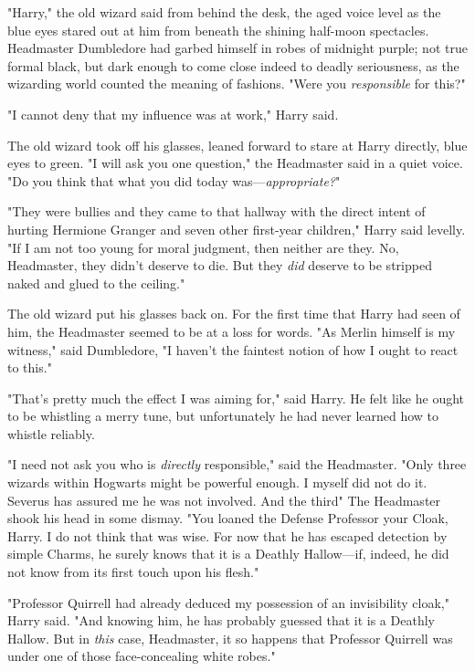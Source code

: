 "Harry," the old wizard said from behind the desk, the aged voice level as the
blue eyes stared out at him from beneath the shining half-moon spectacles.
Headmaster Dumbledore had garbed himself in robes of midnight purple; not true
formal black, but dark enough to come close indeed to deadly seriousness, as
the wizarding world counted the meaning of fashions. "Were you{\el}
\emph{responsible} for this?"

"I cannot deny that my influence was at work," Harry said.

The old wizard took off his glasses, leaned forward to stare at Harry directly,
blue eyes to green. "I will ask you one question," the Headmaster said in a
quiet voice. "Do you think that what you did today was---\emph{appropriate?}"

"They were bullies and they came to that hallway with the direct intent of
hurting Hermione Granger and seven other first-year children," Harry said
levelly. "If I am not too young for moral judgment, then neither are they. No,
Headmaster, they didn't deserve to die. But they \emph{did} deserve to be
stripped naked and glued to the ceiling."

The old wizard put his glasses back on. For the first time that Harry had seen
of him, the Headmaster seemed to be at a loss for words. "As Merlin himself is
my witness," said Dumbledore, "I haven't the faintest notion of how I ought to
react to this."

"That's pretty much the effect I was aiming for," said Harry. He felt like he
ought to be whistling a merry tune, but unfortunately he had never learned how
to whistle reliably.

"I need not ask you who is \emph{directly} responsible," said the Headmaster.
"Only three wizards within Hogwarts might be powerful enough. I myself did not
do it. Severus has assured me he was not involved. And the third{\el}" The
Headmaster shook his head in some dismay. "You loaned the Defense Professor
your Cloak, Harry. I do not think that was wise. For now that he has escaped
detection by simple Charms, he surely knows that it is a Deathly Hallow---if,
indeed, he did not know from its first touch upon his flesh."

"Professor Quirrell had already deduced my possession of an invisibility
cloak," Harry said. "And knowing him, he has probably guessed that it is a
Deathly Hallow. But in \emph{this} case, Headmaster, it so happens that
Professor Quirrell was under one of those face-concealing white robes."


